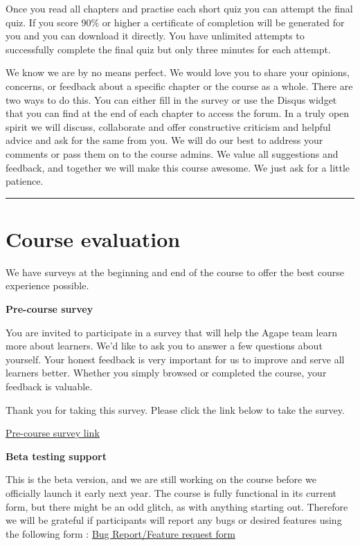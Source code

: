 \documentclass[
]{book}
\begin{document}
Once you read all chapters and practise each short quiz you can attempt the final quiz. If you score 90\% or higher a certificate of completion will be generated for you and you can download it directly. You have unlimited attempts to successfully complete the final quiz but only three minutes for each attempt.

We know we are by no means perfect. We would love you to share your opinions, concerns, or feedback about a specific chapter or the course as a whole. There are two ways to do this. You can either fill in the survey or use the Disqus widget that you can find at the end of each chapter to access the forum. In a truly open spirit we will discuss, collaborate and offer constructive criticism and helpful advice and ask for the same from you. We will do our best to address your comments or pass them on to the course admins. We value all suggestions and feedback, and together we will make this course awesome. We just ask for a little patience.

\begin{center}\rule{0.5\linewidth}{0.5pt}\end{center}

\hypertarget{course-evaluation}{%
\section*{Course evaluation}\label{course-evaluation}}

We have surveys at the beginning and end of the course to offer the best course experience possible.

\textbf{Pre-course survey}

You are invited to participate in a survey that will help the Agape team learn more about learners. We'd like to ask you to answer a few questions about yourself. Your honest feedback is very important for us to improve and serve all learners better. Whether you simply browsed or completed the course, your feedback is valuable.

Thank you for taking this survey. Please click the link below to take the survey.

\href{https://forms.gle/oBLgoyT6G7FvN9uR8}{Pre-course survey link}

\textbf{Beta testing support}

This is the beta version, and we are still working on the course before we officially launch it early next year. The course is fully functional in its current form, but there might be an odd glitch, as with anything starting out. Therefore we will be grateful if participants will report any bugs or desired features using the following form : \href{https://forms.gle/oBLgoyT6G7FvN9uR8}{Bug Report/Feature request form}
\end{document}
